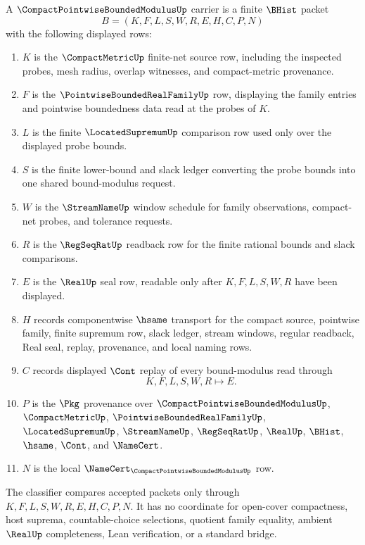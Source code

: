\begin{definition}
\label{def:compact-pointwise-bounded-modulus-carrier}
A $\CompactPointwiseBoundedModulusUp$ carrier is a finite $\BHist$ packet
$$
B=(K,F,L,S,W,R,E,H,C,P,N)
$$
with the following displayed rows:
\begin{enumerate}
\item $K$ is the $\CompactMetricUp$ finite-net source row, including the inspected probes, mesh radius, overlap witnesses, and compact-metric provenance.
\item $F$ is the $\PointwiseBoundedRealFamilyUp$ row, displaying the family entries and pointwise boundedness data read at the probes of $K$.
\item $L$ is the finite $\LocatedSupremumUp$ comparison row used only over the displayed probe bounds.
\item $S$ is the finite lower-bound and slack ledger converting the probe bounds into one shared bound-modulus request.
\item $W$ is the $\StreamNameUp$ window schedule for family observations, compact-net probes, and tolerance requests.
\item $R$ is the $\RegSeqRatUp$ readback row for the finite rational bounds and slack comparisons.
\item $E$ is the $\RealUp$ seal row, readable only after $K,F,L,S,W,R$ have been displayed.
\item $H$ records componentwise $\hsame$ transport for the compact source, pointwise family, finite supremum row, slack ledger, stream windows, regular readback, Real seal, replay, provenance, and local naming rows.
\item $C$ records displayed $\Cont$ replay of every bound-modulus read through
$$
K,F,L,S,W,R \longmapsto E .
$$
\item $P$ is the $\Pkg$ provenance over $\CompactPointwiseBoundedModulusUp$, $\CompactMetricUp$, $\PointwiseBoundedRealFamilyUp$, $\LocatedSupremumUp$, $\StreamNameUp$, $\RegSeqRatUp$, $\RealUp$, $\BHist$, $\hsame$, $\Cont$, and $\NameCert$.
\item $N$ is the local $\NameCert_{\CompactPointwiseBoundedModulusUp}$ row.
\end{enumerate}
The classifier compares accepted packets only through $K,F,L,S,W,R,E,H,C,P,N$. It has no coordinate for open-cover compactness, host suprema, countable-choice selections, quotient family equality, ambient $\RealUp$ completeness, Lean verification, or a standard bridge.
\end{definition}

